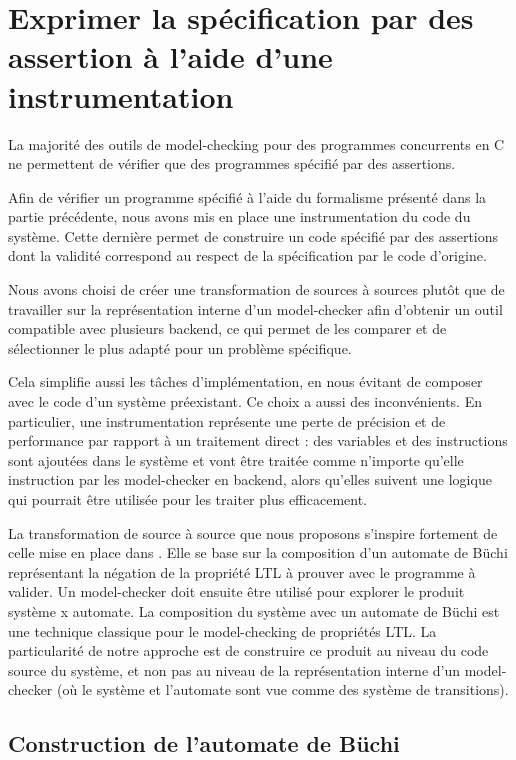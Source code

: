 \chapter{Exprimer la spécification par des assertion à l'aide d'une
instrumentation}\label{sec:Theme2}

La majorité des outils de model-checking pour des programmes concurrents
en C ne permettent de vérifier que des programmes spécifié par des
assertions.

Afin de vérifier un programme spécifié à l'aide du formalisme présenté
dans la partie précédente, nous avons mis en place une instrumentation
du code du système. Cette dernière permet de construire un code spécifié
par des assertions dont la validité correspond au respect de la
spécification par le code d'origine.

Nous avons choisi de créer une transformation de sources à sources
plutôt que de travailler sur la représentation interne d'un
model-checker afin d'obtenir un outil compatible avec plusieurs backend,
ce qui permet de les comparer et de sélectionner le plus adapté pour un
problème spécifique.

Cela simplifie aussi les tâches d'implémentation, en nous évitant de
composer avec le code d'un système préexistant. Ce choix a aussi des
inconvénients. En particulier, une instrumentation représente une perte
de précision et de performance par rapport à un traitement direct : des
variables et des instructions sont ajoutées dans le système et vont être
traitée comme n'importe qu'elle instruction par les model-checker en
backend, alors qu'elles suivent une logique qui pourrait être utilisée
pour les traiter plus efficacement.

La transformation de source à source que nous proposons s'inspire
fortement de celle mise en place dans \cite{morse_ltl}. Elle se base
sur la composition d'un automate de Büchi représentant la négation de la
propriété LTL à prouver avec le programme à valider. Un model-checker
doit ensuite être utilisé pour explorer le produit système x automate.
La composition du système avec un automate de Büchi est une technique
classique pour le model-checking de propriétés
LTL\cite{25_years_of_model_checking}. La particularité de notre
approche est de construire ce produit au niveau du code source du
système, et non pas au niveau de la représentation interne d'un
model-checker (où le système et l'automate sont vue comme des système de
transitions).



\section{Construction de l'automate de Büchi}

